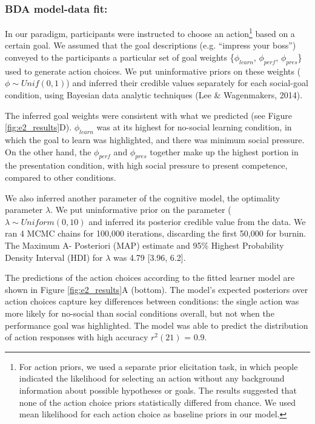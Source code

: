 \documentclass[10pt, letterpaper]{article}
\begin{document}
\subsubsection{BDA model-data fit:}\label{bda-model-data-fit}

In our paradigm, participants were instructed to choose an
action\footnote{For action priors, we used a separate prior elicitation task, in which people indicated the likelihood for selecting an action without any background information about possible hypotheses or goals. The results suggested that none of the action choice priors statistically differed from chance. We used mean likelihood for each action choice as baseline priors in our model.}
based on a certain goal. We assumed that the goal descriptions (e.g.
``impress your boss'') conveyed to the participants a particular set of
goal weights \{\(\phi_{learn}\), \(\phi_{perf}\), \(\phi_{pres}\)\} used
to generate action choices. We put uninformative priors on these weights
(\(\phi \sim Unif(0,1)\)) and inferred their credible values separately
for each social-goal condition, using Bayesian data analytic techniques
(Lee \& Wagenmakers, 2014).

The inferred goal weights were consistent with what we predicted (see
Figure \ref{fig:e2_results}D). \(\phi_{learn}\) was at its highest for
no-social learning condition, in which the goal to learn was
highlighted, and there was minimum social pressure. On the other hand,
the \(\phi_{perf}\) and \(\phi_{pres}\) together make up the highest
portion in the presentation condition, with high social pressure to
present competence, compared to other conditions.

We also inferred another parameter of the cognitive model, the
optimality parameter \(\lambda\). We put uninformative prior on the
parameter (\(\lambda \sim Uniform(0,10)\) and inferred its posterior
credible value from the data. We ran 4 MCMC chains for 100,000
iterations, discarding the first 50,000 for burnin. The Maximum A-
Posteriori (MAP) estimate and 95\% Highest Probability Density Interval
(HDI) for \(\lambda\) was 4.79 {[}3.96, 6.2{]}.

The predictions of the action choices according to the fitted learner
model are shown in Figure \ref{fig:e2_results}A (bottom). The model's
expected posteriors over action choices capture key differences between
conditions: the single action was more likely for no-social than social
conditions overall, but not when the performance goal was highlighted.
The model was able to predict the distribution of action responses with
high accuracy \(r^2(21)\) = 0.9.
\end{document}
